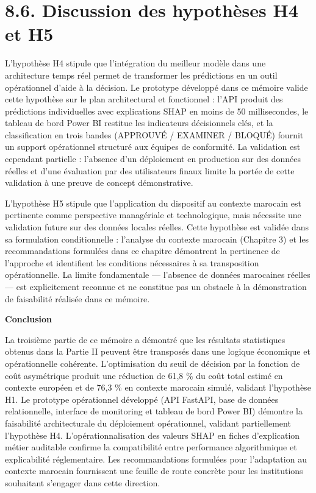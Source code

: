\section{8.6. Discussion des hypothèses H4 et H5}

L'hypothèse H4 stipule que l'intégration du meilleur modèle dans une architecture temps réel permet de transformer les prédictions en un outil opérationnel d'aide à la décision. Le prototype développé dans ce mémoire valide cette hypothèse sur le plan architectural et fonctionnel : l'API produit des prédictions individuelles avec explications SHAP en moins de 50 millisecondes, le tableau de bord Power BI restitue les indicateurs décisionnels clés, et la classification en trois bandes (APPROUVÉ / EXAMINER / BLOQUÉ) fournit un support opérationnel structuré aux équipes de conformité. La validation est cependant partielle : l'absence d'un déploiement en production sur des données réelles et d'une évaluation par des utilisateurs finaux limite la portée de cette validation à une preuve de concept démonstrative.

L'hypothèse H5 stipule que l'application du dispositif au contexte marocain est pertinente comme perspective managériale et technologique, mais nécessite une validation future sur des données locales réelles. Cette hypothèse est validée dans sa formulation conditionnelle : l'analyse du contexte marocain (Chapitre 3) et les recommandations formulées dans ce chapitre démontrent la pertinence de l'approche et identifient les conditions nécessaires à sa transposition opérationnelle. La limite fondamentale — l'absence de données marocaines réelles — est explicitement reconnue et ne constitue pas un obstacle à la démonstration de faisabilité réalisée dans ce mémoire.

\textbf{Conclusion }

La troisième partie de ce mémoire a démontré que les résultats statistiques obtenus dans la Partie II peuvent être transposés dans une logique économique et opérationnelle cohérente. L'optimisation du seuil de décision par la fonction de coût asymétrique produit une réduction de 61,8 \% du coût total estimé en contexte européen et de 76,3 \% en contexte marocain simulé, validant l'hypothèse H1. Le prototype opérationnel développé (API FastAPI, base de données relationnelle, interface de monitoring et tableau de bord Power BI) démontre la faisabilité architecturale du déploiement opérationnel, validant partiellement l'hypothèse H4. L'opérationnalisation des valeurs SHAP en fiches d'explication métier auditable confirme la compatibilité entre performance algorithmique et explicabilité réglementaire. Les recommandations formulées pour l'adaptation au contexte marocain fournissent une feuille de route concrète pour les institutions souhaitant s'engager dans cette direction.

